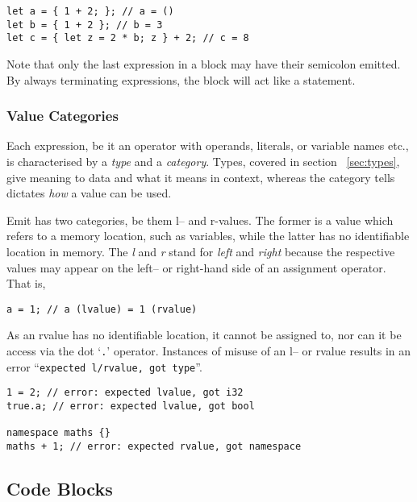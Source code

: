 \documentclass{article}
\begin{document}
    \begin{lstlisting}[language=CustomLang]
let a = { 1 + 2; }; // a = ()
let b = { 1 + 2 }; // b = 3
let c = { let z = 2 * b; z } + 2; // c = 8
    \end{lstlisting}

    Note that only the last expression in a block may have their semicolon emitted.
    By always terminating expressions, the block will act like a statement.

    \subsubsection{Value Categories}

    Each expression, be it an operator with operands, literals, or variable names etc., is characterised by a \textit{type} and a \textit{category}.
    Types, covered in section ~\ref{sec:types}, give meaning to data and what it means in context, whereas the category tells dictates \textit{how} a value can be used.

    Emit has two categories, be them l-- and r-values.
    The former is a value which refers to a memory location, such as variables, while the latter has no identifiable location in memory.
    The \textit{l} and \textit{r} stand for \textit{left} and \textit{right} because the respective values may appear on the left-- or right-hand side of an assignment operator.
    That is,

    \begin{lstlisting}[language=CustomLang]
a = 1; // a (lvalue) = 1 (rvalue)
    \end{lstlisting}

    As an rvalue has no identifiable location, it cannot be assigned to, nor can it be access via the dot `\texttt{.}' operator.
    Instances of misuse of an l-- or rvalue results in an error ``\texttt{expected l/rvalue, got type}''.

    \begin{lstlisting}[language=CustomLang]
1 = 2; // error: expected lvalue, got i32
true.a; // error: expected lvalue, got bool

namespace maths {}
maths + 1; // error: expected rvalue, got namespace
    \end{lstlisting}

    \subsection{Code Blocks}\label{subsec:code-blocks}
\end{document}
